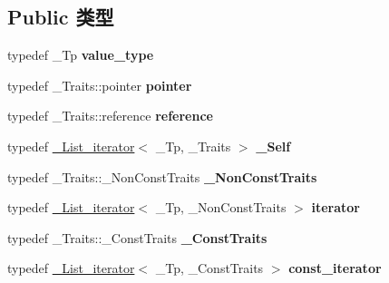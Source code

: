 \subsection*{Public 类型}
\begin{DoxyCompactItemize}
\item 
\mbox{\label{struct___list__iterator_aa565e17c341dd882b3343589f072934b}} 
typedef \+\_\+\+Tp {\bfseries value\+\_\+type}
\item 
\mbox{\label{struct___list__iterator_af8e7746ea976c22513666e7560c7cd88}} 
typedef \+\_\+\+Traits\+::pointer {\bfseries pointer}
\item 
\mbox{\label{struct___list__iterator_a510fb15d95862261b67541d3d11f9738}} 
typedef \+\_\+\+Traits\+::reference {\bfseries reference}
\item 
\mbox{\label{struct___list__iterator_af951b01def79c736d4423373a45be4e8}} 
typedef \hyperlink{struct___list__iterator}{\+\_\+\+List\+\_\+iterator}$<$ \+\_\+\+Tp, \+\_\+\+Traits $>$ {\bfseries \+\_\+\+Self}
\item 
\mbox{\label{struct___list__iterator_a322b3418e8f7ff9c06e959ffb4a2f71c}} 
typedef \+\_\+\+Traits\+::\+\_\+\+Non\+Const\+Traits {\bfseries \+\_\+\+Non\+Const\+Traits}
\item 
\mbox{\label{struct___list__iterator_a8315ae547c950ccdb231f30ab46335c1}} 
typedef \hyperlink{struct___list__iterator}{\+\_\+\+List\+\_\+iterator}$<$ \+\_\+\+Tp, \+\_\+\+Non\+Const\+Traits $>$ {\bfseries iterator}
\item 
\mbox{\label{struct___list__iterator_a79ff93b108ba04cd5f6f9d813282c3f8}} 
typedef \+\_\+\+Traits\+::\+\_\+\+Const\+Traits {\bfseries \+\_\+\+Const\+Traits}
\item 
\mbox{\label{struct___list__iterator_a06fe45b311f01d93c1997ddee6337515}} 
typedef \hyperlink{struct___list__iterator}{\+\_\+\+List\+\_\+iterator}$<$ \+\_\+\+Tp, \+\_\+\+Const\+Traits $>$ {\bfseries const\+\_\+iterator}
\item 
\mbox{\label{struct___list__iterator_a6b84df28b3aea57f351f6232c7d2fc47}} 

\end{DoxyCompactItemize}
